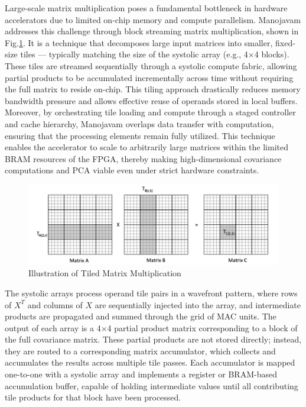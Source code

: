 Large-scale matrix multiplication poses a fundamental bottleneck in hardware accelerators due to limited on-chip memory and compute parallelism. Manojavam addresses this challenge through block streaming matrix multiplication, shown in Fig.\ref{fig:tiled-MM}. It is a technique that decomposes large input matrices into smaller, fixed-size tiles — typically matching the size of the systolic array (e.g., 4×4 blocks). These tiles are streamed sequentially through a systolic compute fabric, allowing partial products to be accumulated incrementally across time without requiring the full matrix to reside on-chip. This tiling approach drastically reduces memory bandwidth pressure and allows effective reuse of operands stored in local buffers\cite{chap3-1}. Moreover, by orchestrating tile loading and compute through a staged controller and cache hierarchy, Manojavam overlaps data transfer with computation, ensuring that the processing elements remain fully utilized. This technique enables the accelerator to scale to arbitrarily large matrices within the limited BRAM resources of the FPGA, thereby making high-dimensional covariance computations and PCA viable even under strict hardware constraints.

\begin{figure}
	\centerline{\includegraphics[scale = 0.75]{Figures/tiled_MM.png}}
	\caption{Illustration of Tiled Matrix Multiplication}
	\label{fig:tiled-MM}
\end{figure}

The systolic arrays process operand tile pairs in a wavefront pattern, where rows of $X^{T}$
and columns of $X$ are sequentially injected into the array, and intermediate products are propagated and summed through the grid of MAC units. The output of each array is a 4×4 partial product matrix corresponding to a block of the full covariance matrix. These partial products are not stored directly; instead, they are routed to a corresponding matrix accumulator, which collects and accumulates the results across multiple tile passes. Each accumulator is mapped one-to-one with a systolic array and implements a register or BRAM-based accumulation buffer, capable of holding intermediate values until all contributing tile products for that block have been processed.

